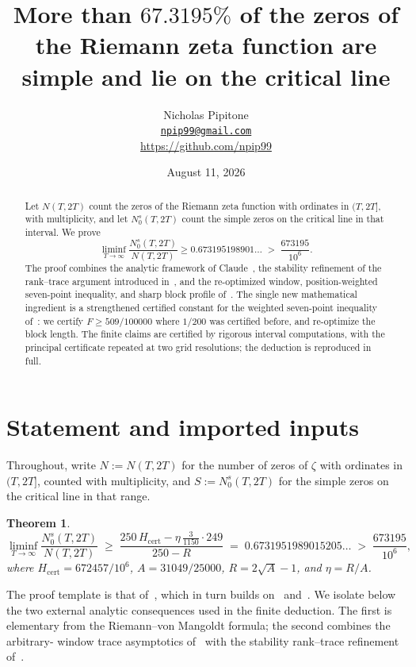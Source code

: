\documentclass[11pt]{article}
\title{More than $67.3195\%$ of the zeros of the Riemann zeta function
are simple and lie on the critical line}
\author{Nicholas Pipitone\\
\href{mailto:npip99@gmail.com}{\texttt{npip99@gmail.com}}\\
\url{https://github.com/npip99}}
\date{August 11, 2026}
\newtheorem{theorem}{Theorem}[section]
\begin{document}
\maketitle

\begin{abstract}
Let $N(T,2T)$ count the zeros of the Riemann zeta function with ordinates in
$(T,2T]$, with multiplicity, and let $N_0^s(T,2T)$ count the simple zeros on
the critical line in that interval.  We prove
\[
 \liminf_{T\to\infty}\frac{N_0^s(T,2T)}{N(T,2T)}
 \ge 0.673195198901\ldots \;>\; \frac{673195}{10^6}.
\]
The proof combines the analytic framework of Claude~\cite{Claude26}, the
stability refinement of the rank--trace argument
introduced in~\cite{Ainta26}, and the re-optimized window, position-weighted
seven-point inequality, and sharp block profile of~\cite{Trmdy26}.  The single
new mathematical ingredient is a strengthened certified constant for the
weighted seven-point inequality of~\cite{Trmdy26}: we certify
$F\ge 509/100000$ where $1/200$ was certified before, and re-optimize the
block length.  The finite claims are certified by rigorous interval
computations, with the principal certificate repeated at two grid
resolutions; the deduction is reproduced in full.
\end{abstract}

\section{Statement and imported inputs}\label{sec:setup}

Throughout, write $N:=N(T,2T)$ for the number of zeros of $\zeta$ with
ordinates in $(T,2T]$, counted with multiplicity, and
$S:=N_0^s(T,2T)$ for the simple zeros on the critical line in that range.

\begin{theorem}\label{thm:main}
\[
 \liminf_{T\to\infty}\frac{N_0^s(T,2T)}{N(T,2T)}
 \;\ge\;
 \frac{250\,H_{\mathrm{cert}}-\eta\,\frac{3}{1150}\cdot 249}{250-R}
 \;=\;0.6731951989015205\ldots\;>\;\frac{673195}{10^{6}},
\]
where $H_{\mathrm{cert}}=672457/10^6$,
$A=31049/25000$, $R=2\sqrt A-1$, and $\eta=R/A$.
\end{theorem}

The proof template is that of~\cite{Trmdy26}, which in turn builds
on~\cite{Ainta26} and~\cite{Claude26}.  We isolate below the two external
analytic consequences used in the finite deduction.  The first is elementary
from the Riemann--von Mangoldt formula; the second combines the arbitrary-
window trace asymptotics of~\cite[\S7.1]{Claude26} with the stability
rank--trace refinement of~\cite{Ainta26}.
\end{document}

